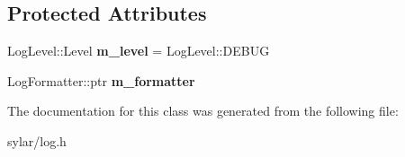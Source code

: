 \subsection*{Protected Attributes}
\begin{DoxyCompactItemize}
\item 
\hypertarget{classsylar_1_1LogAppender_a4e1088a64778dda4d6813275bfb763a1}{Log\-Level\-::\-Level {\bfseries m\-\_\-level} = Log\-Level\-::\-D\-E\-B\-U\-G}\label{classsylar_1_1LogAppender_a4e1088a64778dda4d6813275bfb763a1}

\item 
\hypertarget{classsylar_1_1LogAppender_a6174f622ce2f4d687612912dcb427dd5}{Log\-Formatter\-::ptr {\bfseries m\-\_\-formatter}}\label{classsylar_1_1LogAppender_a6174f622ce2f4d687612912dcb427dd5}

\end{DoxyCompactItemize}


The documentation for this class was generated from the following file\-:\begin{DoxyCompactItemize}
\item 
sylar/log.\-h\end{DoxyCompactItemize}
